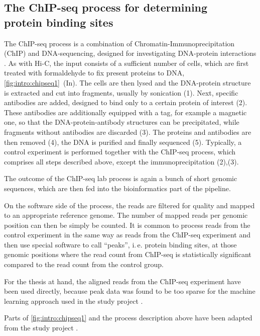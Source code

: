 \subsection[The ChIP-seq process for determining protein binding sites]{The ChIP-seq process for determining\\protein binding sites} \label{sec:intro:chipseq}
The ChIP-seq process is a combination of Chromatin-Immu\-no\-pre\-ci\-pi\-ta\-tion (ChIP) and DNA-sequencing, 
designed for investigating DNA-protein interactions \cite{Johnson2007,Robertson2007}.
As with Hi-C, the input consists of a sufficient number of cells, which are first treated with formaldehyde
to fix present proteins to DNA, \cref{fig:intro:chipseq1}~(In).
The cells are then lysed and the DNA-protein structure is extracted and cut into fragments, 
usually by sonication (1).
Next, specific antibodies are added, designed to bind only to a certain protein of interest (2).
These antibodies are additionally equipped with a tag, for example a magnetic one, so that 
the DNA-protein-antibody structures can be precipitated, while fragments without antibodies are discarded (3).
The proteins and antibodies are then removed (4), 
the DNA is purified and finally sequenced (5).
Typically, a control experiment is performed together with the ChIP-seq process, 
which comprises all steps described above, except the immunoprecipitation (2),(3).

The outcome of the ChIP-seq lab process is again a bunch of short genomic sequences, 
which are then fed into the bioinformatics part of the pipeline.

On the software side of the process, the reads are filtered for quality and mapped to an appropriate reference genome.
The number of mapped reads per genomic position can then be simply be counted.
It is common to process reads from the control experiment in the same way as reads from the ChIP-seq experiment
and then use special software to call ``peaks'', i.\,e. protein binding sites,
at those genomic positions where the read count from ChIP-seq
is statistically significant compared to the read count from the control group.

For the thesis at hand, the aligned reads from the ChIP-seq experiment have been used directly,
because peak data was found to be too sparse for the machine learning approach used 
in the study project \cite{Krauth2020}.

Parts of \cref{fig:intro:chipseq1} and the process description above have been
adapted from the study project \cite{Krauth2020}.

